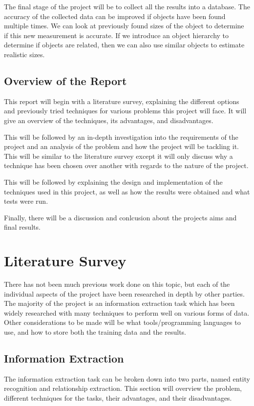 \documentclass[11pt,oneside]{book}
\begin{document}
The final stage of the project will be to collect all the results into a database. The accuracy of the collected data can be improved if objects have been found multiple times. We can look at previously found sizes of the object to determine if this new measurement is accurate. If we introduce an object hierarchy to determine if objects are related, then we can also use similar objects to estimate realistic sizes.

\section{Overview of the Report}

This report will begin with a literature survey, explaining the different options and previously tried techniques for various problems this project will face. It will give an overview of the techniques, its advantages, and disadvantages.

This will be followed by an in-depth investigation into the requirements of the project and an analysis of the problem and how the project will be tackling it. This will be similar to the literature survey except it will only discuss why a technique has been chosen over another with regards to the nature of the project.

This will be followed by explaining the design and implementation of the techniques used in this project, as well as how the results were obtained and what tests were run.

Finally, there will be a discussion and conlcusion about the projects aims and final results.


\chapter{Literature Survey}

There has not been much previous work done on this topic, but each of the individual aspects of the project have been researched in depth by other parties. The majority of the project is an information extraction task which has been widely researched with many techniques to perform well on various forms of data. Other considerations to be made will be what tools/programming languages to use, and how to store both the training data and the results.

\section{Information Extraction}
The information extraction task can be broken down into two parts, named entity recognition and relationship extraction. This section will overview the problem, different techniques for the tasks, their advantages, and their disadvantages.
\end{document}
